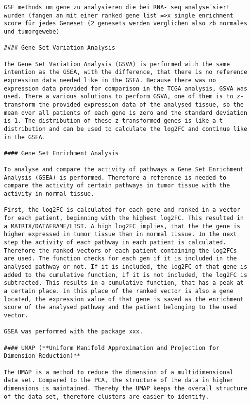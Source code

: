 \documentclass[
  parskip,
  oneside]{scrreprt}
\begin{document}
\begin{verbatim}
GSE methods um gene zu analysieren die bei RNA- seq analyse´siert wurden (fangen an mit einer ranked gene list =>x single enrichment score für jedes Geneset (2 genesets werden verglichen also zb normales und tumorgewebe)

#### Gene Set Variation Analysis

The Gene Set Variation Analysis (GSVA) is performed with the same intention as the GSEA, with the difference, that there is no reference expression data needed like in the GSEA. Because there was no expression data provided for comparison in the TCGA analysis, GSVA was used. There a various solutions to perform GSVA, one of them is to z-transform the provided expression data of the analysed tissue, so the mean over all patients of each gene is zero and the standard deviation is 1. The distribution of these z-transformed genes is like a t-distribution and can be used to calculate the log2FC and continue like in the GSEA.

#### Gene Set Enrichment Analysis 

To analyse and compare the activity of pathways a Gene Set Enrichment Analysis (GSEA) is performed. Therefore a reference is needed to compare the activity of certain pathways in tumor tissue with the activity in normal tissue.

First, the log2FC is calculated for each gene and ranked in a vector for each patient, beginning with the highest log2FC. This resulted in a MATRIX/DATAFRAME/LIST. A high log2FC implies, that the the gene is higher expressed in tumor tissue than in normal tissue. In the next step the activity of each pathway in each patient is calculated. Therefore the ranked vectors of each patient containing the log2FCs are used. The function checks for each gen if it is included in the analysed pathway or not. If it is included, the log2FC of that gene is added to the cumulative function, if it is not included, the log2FC is subtracted. This results in a cumulative function, that has a peak at a certain place. In this place of the ranked vector is also a gene located, the expression value of that gene is saved as the enrichment score of the analysed pathway and the patient belonging to the used vector.

GSEA was performed with the package xxx.

#### UMAP (**Uniform Manifold Approximation and Projection for Dimension Reduction)**

The UMAP is a method to reduce the dimension of a multidimensional data set. Compared to the PCA, the structure of the data in higher dimensions is maintained. Thereby the UMAP keeps the overall structure of the data set, therefore clusters are easier to identify.


\end{verbatim}
\end{document}
